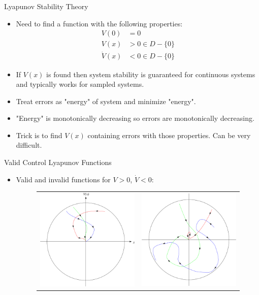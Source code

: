 \documentclass[hyperref={pdfpagelabels=false}]{beamer}
\begin{document}
\begin{frame}{Lyapunov Stability Theory}
\begin{itemize}
\item Need to find a function with the following properties:
\begin{align*}
V(0) &= 0 \\
V(x) &> 0 \in D-\{0\} \\
\dot{V}(x) &< 0 \in D-\{0\}
\end{align*}
\item If $V(x)$ is found then system stability is guaranteed for continuous systems and typically works for sampled systems.
\item Treat errors as "energy" of system and minimize "energy".
\item "Energy" is monotonically decreasing so errors are monotonically decreasing.
\item Trick is to find $V(x)$ containing errors with those properties. Can be very difficult.
\end{itemize}
\end{frame}

\begin{frame}{Valid Control Lyapunov Functions}
\begin{itemize}
\item Valid and invalid functions for $V>0$, $\dot{V}<0$:
\begin{figure}[ht!]
    \centering
    \begin{tabular}{c c}
    \includegraphics[width=.45\textwidth]{images/Vstable} &
    \includegraphics[width=.45\textwidth]{images/Vunstable}
    \end{tabular}
\end{figure}
\end{itemize}
\end{frame}
\end{document}
